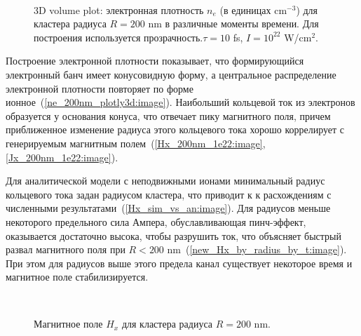 
\begin{figure}[H]
    \hfil
    \\
    \hfil
    \caption{3D volume plot: электронная плотность $n_e$ (в единицах cm$^{-3}$) для кластера радиуса $R = 200$ nm в различные моменты времени. Для построения используется прозрачность.$\tau = 10$ fs, $I = 10^{22}$ W/cm$^2$.}\label{ne_200nm_plotly3d:image}
\end{figure}

Построение электронной плотности показывает, что формирующийся электронный банч имеет конусовидную форму, а центральное распределение электронной плотности повторяет по форме ионное~(\autoref{ne_200nm_plotly3d:image}). Наибольший кольцевой ток из электронов образуется у основания конуса, что отвечает пику магнитного поля, причем приближенное изменение радиуса этого кольцевого тока хорошо коррелирует с генерируемым магнитным полем~(\autoref{Hx_200nm_1e22:image}, \autoref{Jx_200nm_1e22:image}). 

Для аналитической модели с неподвижными ионами минимальный радиус кольцевого тока задан радиусом кластера, что приводит к к расхождениям с численными результатами~(\autoref{Hx_sim_vs_an:image}). Для радиусов меньше некоторого предельного сила Ампера, обуславливающая пинч-эффект, оказывается достаточно высока, чтобы разрушить ток, что объясняет быстрый развал магнитного поля при $R < 200$ nm~(\autoref{new_Hx_by_radius_by_t:image}). При этом для радиусов выше этого предела канал существует некоторое время и магнитное поле стабилизируется.

\begin{figure}[H]
    \\
    \caption{Магнитное поле $H_x$ для кластера радиуса $R = 200$ nm.}\label{Hx_sign_200nm_1e22:image}
\end{figure}

